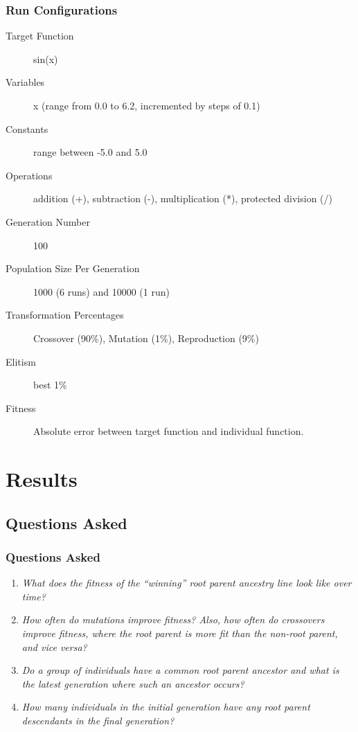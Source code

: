 \documentclass{beamer}
\begin{document}
\begin{frame}
\frametitle{Run Configurations}
\begin{description}
\item[Target Function] sin(x)
\item[Variables] x (range from 0.0 to 6.2, incremented by steps of 0.1)
\item[Constants] range between -5.0 and 5.0
\item[Operations] addition (+), subtraction (-), multiplication (*), protected division (/)
\item[Generation Number] 100
\item[Population Size Per Generation] 1000 (6 runs) and 10000 (1 run)
\item[Transformation Percentages] Crossover (90\%), Mutation (1\%), Reproduction (9\%)
\item[Elitism] best 1\%
\item[Fitness] Absolute error between target function and individual function.
\end{description}
\end{frame}

\section[Results]{Results}

\subsection[Questions Asked]{Questions Asked}

\begin{frame}
\frametitle{Questions Asked}
\begin{enumerate}
\item \emph{What does the fitness of the ``winning'' root parent ancestry line look like over time?}
\item \emph{How often do mutations improve fitness? Also, how often do crossovers improve fitness, where the root parent is more fit than the non-root parent, and vice versa?}
\item \emph{Do a group of individuals have a common root parent ancestor and what is the latest generation where such an ancestor occurs?}
\item \emph{How many individuals in the initial generation have any root parent descendants in the final generation?}
\end{enumerate}
\end{frame}
\end{document}
